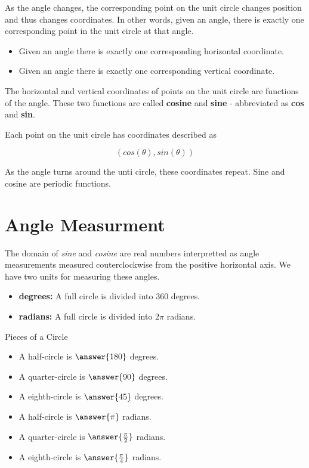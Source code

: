 \documentclass{ximera}
\begin{document}
\begin{example}
As the angle changes, the corresponding point on the unit circle changes position and thus changes coordinates.  In other words, given an angle, there is exactly one corresponding point in the unit circle at that angle.  

\begin{itemize}
\item Given an angle there is exactly one corresponding horizontal coordinate.
\item Given an angle there is exactly one corresponding vertical coordinate. 
\end{itemize}


The horizontal and vertical coordinates of points on the unit circle are functions of the angle.  These two functions are called \textbf{cosine} and \textbf{sine} - abbreviated as \textbf{cos} and \textbf{sin}.

Each point on the unit circle has coordinates described as 

\[  (cos(\theta), sin(\theta))  \] 

As the angle turns around the unti circle, these coordinates repeat. Sine and cosine are periodic functions.

\end{example}




\section{Angle Measurment}

The domain of \textit{sine} and \textit{cosine} are real numbers interpretted as angle measurements measured couterclockwise from the positive horizontal axis.  We have two units for measuring these angles.


\begin{itemize}
\item \textbf{degrees:}  A full circle is divided into $360$ degrees.
\item \textbf{radians:}  A full circle is divided into $2\pi$ radians.
\end{itemize}


\begin{question} Pieces of a Circle
	\begin{itemize}
		\item A half-circle is $\answer{180}$ degrees.
		\item A quarter-circle is $\answer{90}$ degrees.
		\item A eighth-circle is $\answer{45}$ degrees.
		\item A half-circle is $\answer{\pi}$ radians.
		\item A quarter-circle is $\answer{\frac{\pi}{2}}$ radians.
		\item A eighth-circle is $\answer{\frac{\pi}{4}}$ radians.

	\end{itemize}
\end{question}
\end{document}
